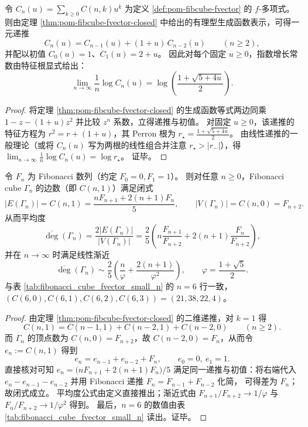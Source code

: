 \begin{corollary}\label{cor:pom-fibcube-fpoly-growth-constant}
令 \(C_n(u)=\sum_{k\ge 0}C(n,k)u^k\) 为定义 \ref{def:pom-fibcube-fvector} 的 \(f\)-多项式。
则由定理 \ref{thm:pom-fibcube-fvector-closed} 中给出的有理型生成函数表示，可得一元递推
\[
C_n(u)=C_{n-1}(u)+(1+u)\,C_{n-2}(u)\qquad(n\ge 2),
\]
并配以初值 \(C_0(u)=1\)、\(C_1(u)=2+u\)。
因此对每个固定 \(u\ge 0\)，指数增长常数由特征根显式给出：
\[
\lim_{n\to\infty}\frac{1}{n}\log C_n(u)
=\log\!\left(\frac{1+\sqrt{5+4u}}{2}\right).
\]
\end{corollary}
\begin{proof}
将定理 \ref{thm:pom-fibcube-fvector-closed} 的生成函数等式两边同乘 \(1-z-(1+u)z^2\) 并比较 \(z^n\) 系数，立得递推与初值。
对固定 \(u\ge 0\)，该递推的特征方程为
\(
r^2=r+(1+u)
\)，其 Perron 根为
\(
r_\star=\frac{1+\sqrt{5+4u}}{2}
\)。
由线性递推的一般理论（或将 \(C_n(u)\) 写为两根的线性组合并注意 \(r_\star>|r_-|\)），得
\(
\lim_{n\to\infty}\frac{1}{n}\log C_n(u)=\log r_\star
\)。
证毕。
\end{proof}

\begin{corollary}\label{cor:pom-fibcube-edge-closed-form}
令 \(F_n\) 为 Fibonacci 数列（约定 \(F_0=0,F_1=1\)）。
则对任意 \(n\ge 0\)，Fibonacci cube \(\Gamma_n\) 的边数（即 \(C(n,1)\)）满足闭式
\[
|E(\Gamma_n)|=C(n,1)=\frac{nF_{n+1}+2(n+1)F_n}{5},
\qquad
|V(\Gamma_n)|=C(n,0)=F_{n+2}.
\]
从而平均度
\[
\overline{\deg}(\Gamma_n)
=\frac{2|E(\Gamma_n)|}{|V(\Gamma_n)|}
=\frac{2}{5}\left(
n\frac{F_{n+1}}{F_{n+2}}+2(n+1)\frac{F_n}{F_{n+2}}
\right),
\]
并在 \(n\to\infty\) 时满足线性渐近
\[
\overline{\deg}(\Gamma_n)
\sim
\frac{2}{5}\left(\frac{n}{\varphi}+\frac{2(n+1)}{\varphi^2}\right),
\qquad
\varphi=\frac{1+\sqrt5}{2}.
\]
与表 \ref{tab:fibonacci_cube_fvector_small_n} 的 \(n=6\) 行一致，
\(
(C(6,0),C(6,1),C(6,2),C(6,3))=(21,38,22,4)
\)。
\end{corollary}
\begin{proof}
由定理 \ref{thm:pom-fibcube-fvector-closed} 的二维递推，对 \(k=1\) 得
\[
C(n,1)=C(n-1,1)+C(n-2,1)+C(n-2,0)\qquad(n\ge 2).
\]
而 \(\Gamma_n\) 的顶点数为 \(C(n,0)=F_{n+2}\)，故 \(C(n-2,0)=F_n\)，从而令 \(e_n:=C(n,1)\) 得到
\[
e_n=e_{n-1}+e_{n-2}+F_n,\qquad e_0=0,\ e_1=1.
\]
直接核对可知
\(
e_n=\bigl(nF_{n+1}+2(n+1)F_n\bigr)/5
\)
满足同一递推与初值：将右端代入 \(e_n-e_{n-1}-e_{n-2}\) 并用 Fibonacci 递推 \(F_n=F_{n-1}+F_{n-2}\) 化简，
可得差为 \(F_n\)；
故闭式成立。
平均度公式由定义直接推出；渐近式由 \(F_{n+1}/F_{n+2}\to 1/\varphi\) 与 \(F_n/F_{n+2}\to 1/\varphi^2\) 得到。
最后，\(n=6\) 的数值由表 \ref{tab:fibonacci_cube_fvector_small_n} 读出。证毕。
\end{proof}

